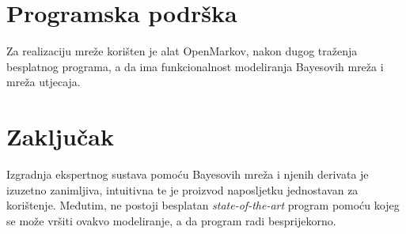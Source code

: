 \documentclass{article}
\begin{document}
	\section{Programska podrška}
	Za realizaciju mreže korišten je alat OpenMarkov, nakon dugog traženja besplatnog programa, a da ima funkcionalnost modeliranja Bayesovih mreža i mreža utjecaja.
	
	\section{Zaključak}
	Izgradnja ekspertnog sustava pomoću Bayesovih mreža i njenih derivata je izuzetno zanimljiva, intuitivna te je proizvod naposljetku jednostavan za korištenje. Međutim, ne postoji besplatan \textit{state-of-the-art} program pomoću kojeg se može vršiti ovakvo modeliranje, a da program radi besprijekorno.
		
\end{document}
